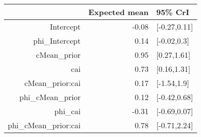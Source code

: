 \begin{tabular}{rrl}
  \hline
 & Expected mean & 95\% CrI \\ 
  \hline
Intercept & -0.08 & [-0.27,0.11] \\ 
  phi\_Intercept & 0.14 & [-0.02,0.3] \\ 
  cMean\_prior & 0.95 & [0.27,1.61] \\ 
  cai & 0.73 & [0.16,1.31] \\ 
  cMean\_prior:cai & 0.17 & [-1.54,1.9] \\ 
  phi\_cMean\_prior & 0.12 & [-0.42,0.68] \\ 
  phi\_cai & -0.31 & [-0.69,0.07] \\ 
  phi\_cMean\_prior:cai & 0.78 & [-0.71,2.24] \\ 
   \hline
\end{tabular}


